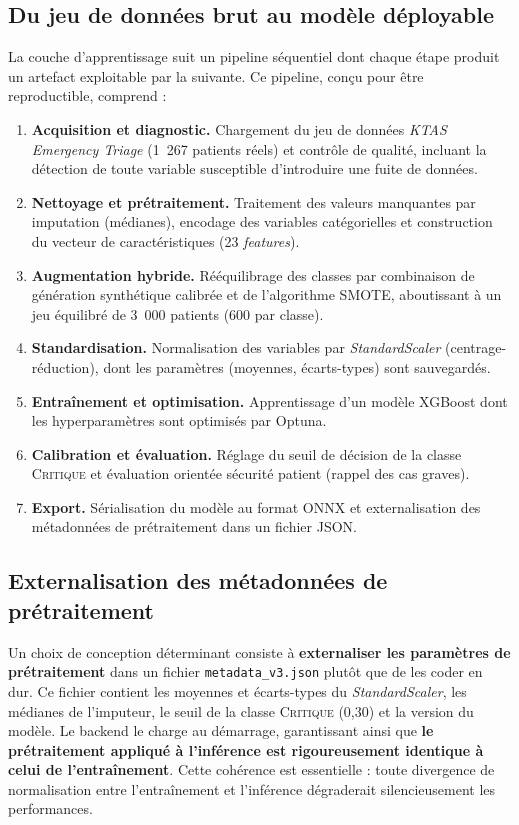 \subsection{Du jeu de données brut au modèle déployable}
La couche d'apprentissage suit un pipeline séquentiel dont chaque étape produit un artefact
exploitable par la suivante. Ce pipeline, conçu pour être reproductible, comprend :

\begin{enumerate}
  \item \textbf{Acquisition et diagnostic.} Chargement du jeu de données \textit{KTAS
  Emergency Triage} (1~267 patients réels) et contrôle de qualité, incluant la détection de
  toute variable susceptible d'introduire une fuite de données.
  \item \textbf{Nettoyage et prétraitement.} Traitement des valeurs manquantes par imputation
  (médianes), encodage des variables catégorielles et construction du vecteur de
  caractéristiques (23 \textit{features}).
  \item \textbf{Augmentation hybride.} Rééquilibrage des classes par combinaison de génération
  synthétique calibrée et de l'algorithme SMOTE, aboutissant à un jeu équilibré de 3~000
  patients (600 par classe).
  \item \textbf{Standardisation.} Normalisation des variables par \textit{StandardScaler}
  (centrage-réduction), dont les paramètres (moyennes, écarts-types) sont sauvegardés.
  \item \textbf{Entraînement et optimisation.} Apprentissage d'un modèle XGBoost dont les
  hyperparamètres sont optimisés par Optuna.
  \item \textbf{Calibration et évaluation.} Réglage du seuil de décision de la classe
  \textsc{Critique} et évaluation orientée sécurité patient (rappel des cas graves).
  \item \textbf{Export.} Sérialisation du modèle au format ONNX et externalisation des
  métadonnées de prétraitement dans un fichier JSON.
\end{enumerate}

\subsection{Externalisation des métadonnées de prétraitement}
Un choix de conception déterminant consiste à \textbf{externaliser les paramètres de
prétraitement} dans un fichier \texttt{metadata\_v3.json} plutôt que de les coder en dur. Ce
fichier contient les moyennes et écarts-types du \textit{StandardScaler}, les médianes de
l'imputeur, le seuil de la classe \textsc{Critique} (0,30) et la version du modèle. Le backend
le charge au démarrage, garantissant ainsi que \textbf{le prétraitement appliqué à l'inférence
est rigoureusement identique à celui de l'entraînement}. Cette cohérence est essentielle :
toute divergence de normalisation entre l'entraînement et l'inférence dégraderait silencieusement
les performances.

